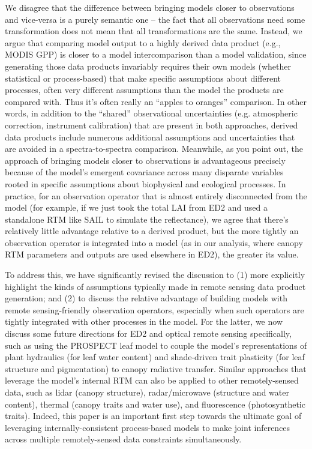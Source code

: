 We disagree that the difference between bringing models closer to observations and vice-versa is a purely semantic one -- the fact that all observations need some transformation does not mean that all transformations are the same. Instead, we argue that comparing model output to a highly derived data product (e.g., MODIS GPP) is closer to a model intercomparison than a model validation, since generating those data products invariably requires their own models (whether statistical or process-based) that make specific assumptions about different processes, often very different assumptions than the model the products are compared with. Thus it's often really an “apples to oranges'' comparison.  In other words, in addition to the “shared” observational uncertainties (e.g. atmospheric correction, instrument calibration) that are present in both approaches, derived data products include numerous additional assumptions and uncertainties that are avoided in a spectra-to-spectra comparison. Meanwhile, as you point out, the approach of bringing models closer to observations is advantageous precisely because of the model’s emergent covariance across many disparate variables rooted in specific assumptions about biophysical and ecological processes. In practice, for an observation operator that is almost entirely disconnected from the model (for example, if we just took the total LAI from ED2 and used a standalone RTM like SAIL to simulate the reflectance), we agree that there’s relatively little advantage relative to a derived product, but the more tightly an observation operator is integrated into a model (as in our analysis, where canopy RTM parameters and outputs are used elsewhere in ED2), the greater its value.

To address this, we have significantly revised the discussion to (1) more explicitly highlight the kinds of assumptions typically made in remote sensing data product generation; and (2) to discuss the relative advantage of building models with remote sensing-friendly observation operators, especially when such operators are tightly integrated with other processes in the model. For the latter, we now discuss some future directions for ED2 and optical remote sensing specifically, such as using the PROSPECT leaf model to couple the model’s representations of plant hydraulics (for leaf water content) and shade-driven trait plasticity (for leaf structure and pigmentation) to canopy radiative transfer. Similar approaches that leverage the model’s internal RTM can also be applied to other remotely-sensed data, such as lidar (canopy structure), radar/microwave (structure and water content), thermal (canopy traits and water use), and fluorescence (photosynthetic traits). Indeed, this paper is an important first step towards the ultimate goal of leveraging internally-consistent process-based models to make joint inferences across multiple remotely-sensed data constraints simultaneously.

